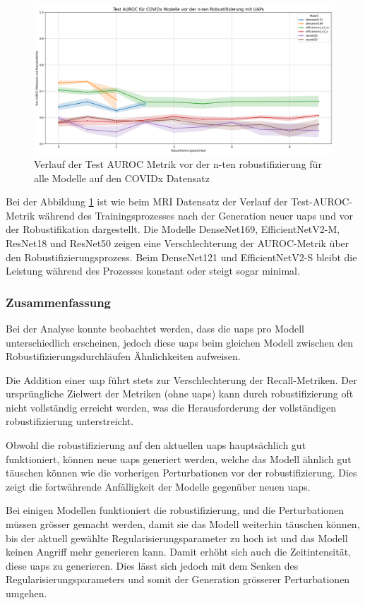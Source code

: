 \begin{figure}[H]
    \centering
    \includegraphics[width=\linewidth]{01-images/05-resultate/VerlaufAUROC_COVIDx.png}
    \caption{Verlauf der Test AUROC Metrik vor der n-ten \Gls{robustifizierung} für alle Modelle auf den COVIDx Datensatz}
    \label{fig:VerlaufAUROC COVIDx}
\end{figure}

Bei der Abbildung \ref{fig:VerlaufAUROC COVIDx} ist wie beim MRI Datensatz der Verlauf der Test-AUROC-Metrik während des Trainingsprozesses nach der Generation neuer \acrshort{uap}s und vor der Robustifikation dargestellt. Die Modelle DenseNet169, EfficientNetV2-M, ResNet18 und ResNet50 zeigen eine Verschlechterung der AUROC-Metrik über den Robustifizierungsprozess. Beim DenseNet121 und EfficientNetV2-S bleibt die Leistung während des Prozesses konstant oder steigt sogar minimal.

\subsubsection{Zusammenfassung}

Bei der Analyse konnte beobachtet werden, dass die \acrshort{uap}s pro Modell unterschiedlich erscheinen, jedoch diese \acrshort{uap}s beim gleichen Modell zwischen den Robustifizierungsdurchläufen Ähnlichkeiten aufweisen.

Die Addition einer \acrshort{uap} führt stets zur Verschlechterung der Recall-Metriken. Der ursprüngliche Zielwert der Metriken (ohne \acrshort{uap}s) kann durch \Gls{robustifizierung} oft nicht vollständig erreicht werden, was die Herausforderung der vollständigen \Gls{robustifizierung} unterstreicht.

Obwohl die \Gls{robustifizierung} auf den aktuellen \acrshort{uap}s hauptsächlich gut funktioniert, können neue \acrshort{uap}s generiert werden, welche das Modell ähnlich gut täuschen können wie die vorherigen Perturbationen vor der \Gls{robustifizierung}. Dies zeigt die fortwährende Anfälligkeit der Modelle gegenüber neuen \acrshort{uap}s.

Bei einigen Modellen funktioniert die \Gls{robustifizierung}, und die Perturbationen müssen grösser gemacht werden, damit sie das Modell weiterhin täuschen können, bis der aktuell gewählte Regularisierungsparameter zu hoch ist und das Modell keinen Angriff mehr generieren kann. Damit erhöht sich auch die Zeitintensität, diese \acrshort{uap}s zu generieren. Dies lässt sich jedoch mit dem Senken des Regularisierungsparameters und somit der Generation grösserer Perturbationen umgehen.

